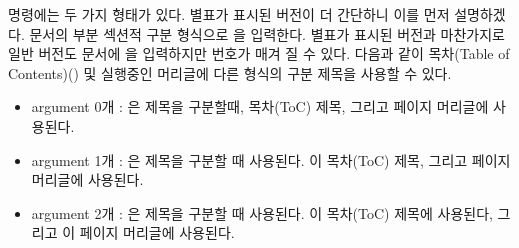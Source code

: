 명령에는 두 가지 형태가 있다. 별표가 표시된 버전이 더 간단하니 이를 먼저 설명하겠다. 문서의 부분 섹션적 구분 형식으로 을 입력한다.
별표가 표시된 버전과 마찬가지로 일반 버전도 문서에 을 입력하지만 번호가 매겨 질 수 있다. 다음과 같이 목차(Table of Contents)(\toc) 및 실행중인 머리글에 다른 형식의 구분 제목을 사용할 수 있다.
\begin{itemize}
  \item argument 0개 : 은 제목을 구분할때, 목차(ToC) 제목, 그리고 페이지 머리글에 사용된다.
  \item argument 1개 : 은 제목을 구분할 때 사용된다. 이 목차(ToC) 제목, 그리고 페이지 머리글에 사용된다.
  \item argument 2개 :  은 제목을 구분할 때 사용된다. 이 목차(ToC) 제목에 사용된다, 그리고 이 페이지 머리글에 사용된다.
\end{itemize}

